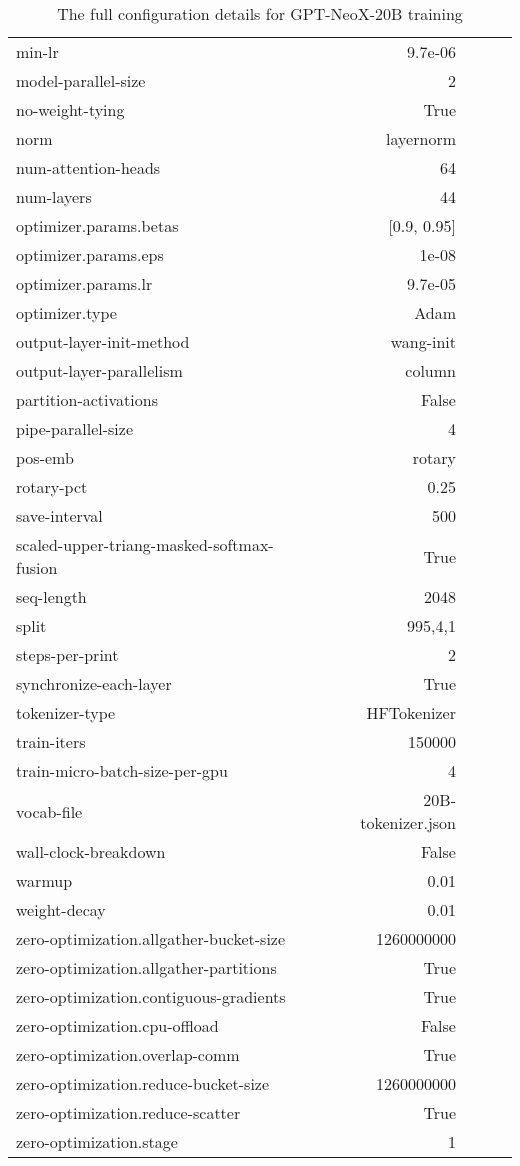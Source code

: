 \documentclass[11pt]{article}
\newcommand{\model}{GPT-NeoX-20B}
\begin{document}
\begin{table}[ht!]
{\begin{tabular}{lrrcc}
    min-lr & 9.7e-06 \\
    model-parallel-size & 2 \\
    no-weight-tying & True \\
    norm & layernorm \\
    num-attention-heads & 64 \\
    num-layers & 44 \\
    optimizer.params.betas & [0.9, 0.95] \\
    optimizer.params.eps & 1e-08 \\
    optimizer.params.lr & 9.7e-05 \\
    optimizer.type & Adam \\
    output-layer-init-method & wang-init \\
    output-layer-parallelism & column \\
    partition-activations & False \\
    pipe-parallel-size & 4 \\
    pos-emb & rotary \\
    rotary-pct & 0.25 \\
    save-interval & 500 \\
    scaled-upper-triang-masked-softmax-fusion & True \\
    seq-length & 2048 \\
    split & 995,4,1 \\
    steps-per-print & 2 \\
    synchronize-each-layer & True \\
    tokenizer-type & HFTokenizer \\
    train-iters & 150000 \\
    train-micro-batch-size-per-gpu & 4 \\
    vocab-file & 20B-tokenizer.json \\
    wall-clock-breakdown & False \\
    warmup & 0.01 \\
    weight-decay & 0.01 \\
    zero-optimization.allgather-bucket-size & 1260000000 \\
    zero-optimization.allgather-partitions & True \\
    zero-optimization.contiguous-gradients & True \\
    zero-optimization.cpu-offload & False \\
    zero-optimization.overlap-comm & True \\
    zero-optimization.reduce-bucket-size & 1260000000 \\
    zero-optimization.reduce-scatter & True \\
    zero-optimization.stage & 1 \\
    \end{tabular}
}
\caption{The full configuration details for \model{} training}
\label{tab:config}
\end{table}
\clearpage
\end{document}
